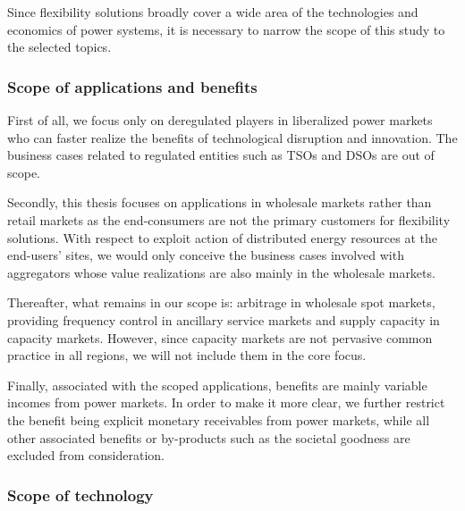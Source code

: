 




Since flexibility solutions broadly cover a wide area of the technologies and economics of power systems, it is necessary to narrow the scope of this study to the selected topics.

\subsubsection{Scope of applications and benefits}

First of all, we focus only on deregulated players in liberalized power markets who can faster realize the benefits of technological disruption and innovation. The business cases related to regulated entities such as TSOs and DSOs are out of scope.

Secondly, this thesis focuses on applications in wholesale markets rather than retail markets as the end-consumers are not the primary customers for flexibility solutions. With respect to exploit action of distributed energy resources at the end-users' sites, we would only conceive the business cases involved with aggregators whose value realizations are also mainly in the wholesale markets.

Thereafter, what remains in our scope is: arbitrage in wholesale spot markets, providing frequency control in ancillary service markets and supply capacity in capacity markets. However, since capacity markets are not pervasive common practice in all regions, we will not include them in the core focus.

Finally, associated with the scoped applications, benefits are mainly variable incomes from power markets. In order to make it more clear, we further restrict the benefit being explicit monetary receivables from power markets, while all other associated benefits or by-products such as the societal goodness are excluded from consideration. 

\subsubsection{Scope of technology}

